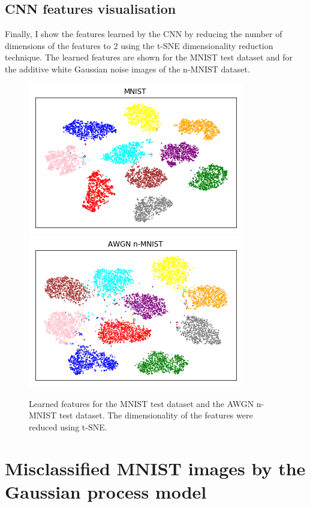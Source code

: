 \documentclass{article}
\begin{document}
\subsection{CNN features visualisation}
Finally, I show the features learned by the CNN by reducing the number of dimensions of the features to 2 using the t-SNE \cite{maaten2008visualizing} dimensionality reduction technique. The learned features are shown for the MNIST test dataset and for the additive white Gaussian noise images of the n-MNIST dataset.

\begin{figure}[H]
	\centering
	\includegraphics[scale=0.48]{embeddings_visualisation.png}
	\includegraphics[scale=0.48]{noisy_embeddings_visualisation}
	\caption{Learned features for the MNIST test dataset and the AWGN n-MNIST test dataset. The dimensionality of the features were reduced using t-SNE.}
\end{figure}

\small




\newpage
\appendix 
\section{Misclassified MNIST images by the Gaussian process model}
\label{appendix/mnist_error}
\end{document}
